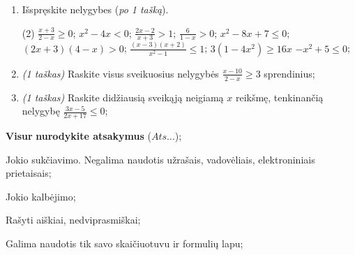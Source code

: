\documentclass[a4paper]{article}
\begin{document}
\begin{enumerate}
      \item Išspręskite nelygybes (\textit{po 1 tašką}).

            \begin{tasks}[item-format={\normalfont}, after-item-skip=2mm](2)
                  \task $\frac{x+3}{2-x} \geqslant 0$;
                  \task $x^2-4x<0$;
                  \task $\frac{2x-2}{x+3}>1$;
                  \task $\frac{6}{1-x}>0$;
                  \task $x^2-8x+7 \leqslant 0$;
                  \task $(2x+3)(4-x)>0$;
                  \task $\frac{(x-3)(x+2)}{x^2-1} \leqslant 1$;
                  \task $3(1-4x^2) \geqslant 16x$
                  \task $-x^2+5 \leq 0$;
            \end{tasks}

      \item \textit{(1 taškas)} Raskite visus sveikuosius nelygybės $\frac{x-10}{2-x}\geqslant 3$ sprendinius;
      \item \textit{(1 taškas)} Raskite didžiausią sveikąją neigiamą $x$ reikšmę, tenkinančią nelygybę $\frac{3x-5}{2x+17} \leqslant 0$;
\end{enumerate}

\begin{small}
      \begin{enumerate*}[label={(\arabic*)}]
            \item \textbf{Visur} \textbf{nurodykite atsakymus} ($Ats\ldots$);
            \item Jokio sukčiavimo. Negalima naudotis užrašais, vadovėliais,
            elektroniniais prietaisais;
            \item Jokio kalbėjimo;
            \item Rašyti aiškiai, nedviprasmiškai;
            \item Galima naudotis tik savo skaičiuotuvu ir formulių lapu;
      \end{enumerate*}
\end{small}
\end{document}
